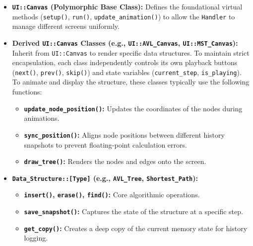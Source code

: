 \begin{itemize}
    \item \textbf{\texttt{UI::Canvas} (Polymorphic Base Class):} Defines the foundational virtual methods (\texttt{setup()}, \texttt{run()}, \texttt{update\_animation()}) to allow the \texttt{Handler} to manage different screens uniformly.

    \item \textbf{Derived \texttt{UI::Canvas} Classes (e.g., \texttt{UI::AVL\_Canvas}, \texttt{UI::MST\_Canvas}):} Inherit from \texttt{UI::\allowbreak Canvas} to render specific data structures. To maintain strict encapsulation, each class independently controls its own playback buttons (\texttt{next()}, \texttt{prev()}, \texttt{skip()}) and state variables (\texttt{current\_step}, \texttt{is\_playing}). To animate and display the structure, these classes typically use the following functions:
    \begin{itemize}
        \item \textbf{\texttt{update\_node\_position()}:} Updates the coordinates of the nodes during animations.
        \item \textbf{\texttt{sync\_position()}:} Aligns node positions between different history snapshots to prevent floating-point calculation errors.
        \item \textbf{\texttt{draw\_tree()}:} Renders the nodes and edges onto the screen.
    \end{itemize}

    \item \textbf{\texttt{Data\_Structure::[Type]} (e.g., \texttt{AVL\_Tree}, \texttt{Shortest\_Path}):}
    \begin{itemize}
        \item \textbf{\texttt{insert()}, \texttt{erase()}, \texttt{find()}:} Core algorithmic operations.
        \item \textbf{\texttt{save\_snapshot()}:} Captures the state of the structure at a specific step.
        \item \textbf{\texttt{get\_copy()}:} Creates a deep copy of the current memory state for history logging.
    \end{itemize}
\end{itemize}

